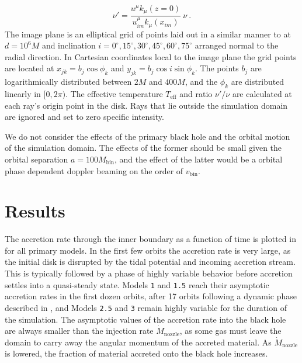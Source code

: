 \begin{equation}
	\nu' = \frac{u^\mu k_\mu(z=0)}{u^\mu_{im} k_\mu(x_{im})} \ \nu \ .
\end{equation}
The image plane is an elliptical grid of points laid out in a similar manner to \cite{Kulkarni11} at $d=10^6M$ and inclination $i = 0^\circ, 15^\circ, 30^\circ, 45^\circ, 60^\circ, 75^\circ$ arranged normal to the radial direction.  In Cartesian coordinates local to the image plane the grid points are located at $x_{jk} = b_j \cos \phi_k$ and $y_{jk} = b_j \cos i \sin \phi_k$.  The points $b_j$ are logarithmically distributed between $2M$ and $400M$, and the  $\phi_k$ are distributed linearly in $[0, 2\pi)$. The effective temperature $T_\text{eff}$ and ratio $\nu' / \nu$ are calculated at each ray's origin point in the disk.  Rays that lie outside the simulation domain are ignored and set to zero specific intensity.

We do not consider the effects of the primary black hole and the orbital motion of the simulation domain.  The effects of the former should be small given the orbital separation $a = 100M_\text{bin}$, and the effect of the latter would be a orbital phase dependent doppler beaming on the order of $v_\text{bin}$.



\section{Results}

The accretion rate through the inner boundary as a function of time is plotted in  for all primary models.  In the first few orbits the accretion rate is very large, as the initial disk is disrupted by the tidal potential and incoming accretion stream.  This is typically followed by a phase of highly variable behavior before accretion settles into a quasi-steady state.  Models \texttt{1} and \texttt{1.5} reach their asymptotic accretion rates in the first dozen orbits,  after 17 orbits following a dynamic phase described in , and Models \texttt{2.5} and \texttt{3} remain highly variable for the duration of the simulation.  The asymptotic values of the accretion rate into the black hole are always smaller than the injection rate $\dot{M}_\text{nozzle}$, as some gas must leave the domain to carry away the angular momentum of the accreted material.  As $\dot{M}_\text{nozzle}$ is lowered, the fraction of material accreted onto the black hole increases.

